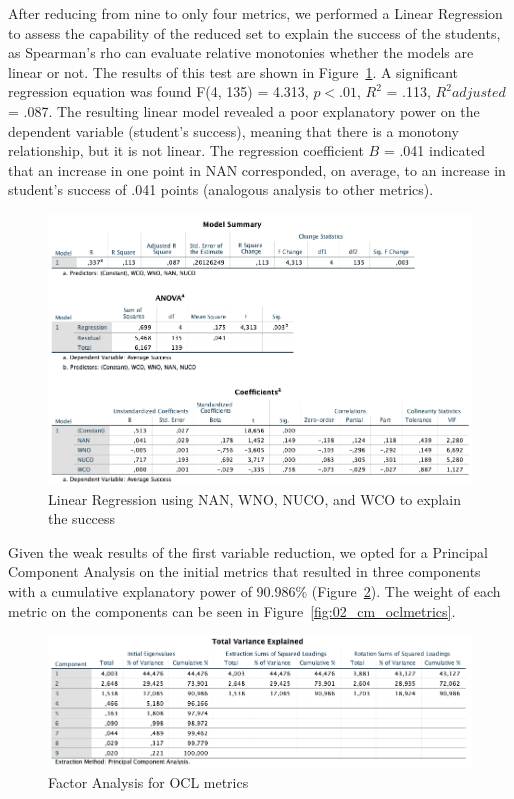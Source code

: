 After reducing from nine to only four metrics, we performed a Linear Regression to assess the capability of the reduced set to explain the success of the students, as Spearman's rho can evaluate relative monotonies whether the models are linear or not. The results of this test are shown in Figure~\ref{fig:01_lr_oclmetrics}. A significant regression equation was found F(4, 135) = 4.313, $p<.01$, $R^{2}$ = .113, $R^{2}adjusted$ = .087. The resulting linear model revealed a poor explanatory power on the dependent variable (student's success), meaning that there is a monotony relationship, but it is not linear. The regression coefficient $B$ = .041 indicated that an increase in one point in NAN corresponded, on average, to an increase in student's success of .041 points (analogous analysis to other metrics).

\begin{figure}[ht]
\centering
\includegraphics[width=1\textwidth]{Chapters/figures/6_Results/Section2/01_LR_OCLmetrics.png}
\caption{Linear Regression using NAN, WNO, NUCO, and WCO to explain the success}
\label{fig:01_lr_oclmetrics}
\end{figure}

Given the weak results of the first variable reduction, we opted for a Principal Component Analysis on the initial metrics that resulted in three components with a cumulative explanatory power of 90.986\% (Figure~\ref{fig:02_fa_oclmetrics}). The weight of each metric on the components can be seen in Figure~\ref{fig:02_cm_oclmetrics}. 

\begin{figure}[ht]
\centering
\includegraphics[width=1\textwidth]{Chapters/figures/6_Results/Section2/02_FA_TotalVarianceExplained.png}
\caption{Factor Analysis for OCL metrics}
\label{fig:02_fa_oclmetrics}
\end{figure}

